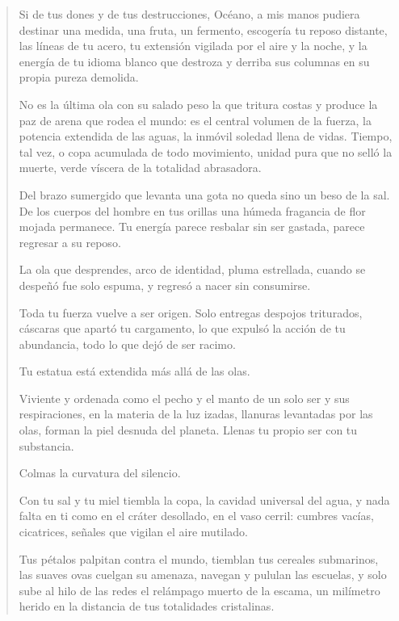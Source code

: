 \documentclass[12pt]{article}
\begin{document}
\clearpage
{}
\begin{verse}
Si de tus dones y de tus destrucciones, Océano, a mis manos  
pudiera destinar una medida, una fruta, un fermento,  
escogería tu reposo distante, las líneas de tu acero,  
tu extensión vigilada por el aire y la noche,  
y la energía de tu idioma blanco  
que destroza y derriba sus columnas  
en su propia pureza demolida.  
	
 No es la última ola con su salado peso  
 la que tritura costas y produce  
 la paz de arena que rodea el mundo:  
 es el central volumen de la fuerza,  
 la potencia extendida de las aguas,  
 la inmóvil soledad llena de vidas.  
 Tiempo, tal vez, o copa acumulada  
 de todo movimiento, unidad pura  
 que no selló la muerte, verde víscera  
 de la totalidad abrasadora.  
	 
 Del brazo sumergido que levanta una gota  
 no queda sino un beso de la sal. De los cuerpos  
 del hombre en tus orillas una húmeda fragancia  
 de flor mojada permanece. Tu energía  
 parece resbalar sin ser gastada,  
 parece regresar a su reposo.  
	 
 La ola que desprendes,  
 arco de identidad, pluma estrellada,  
 cuando se despeñó fue solo espuma,  
 y regresó a nacer sin consumirse.  
	 
 Toda tu fuerza vuelve a ser origen.  
 Solo entregas despojos triturados,  
 cáscaras que apartó tu cargamento,  
 lo que expulsó la acción de tu abundancia,  
 todo lo que dejó de ser racimo.  
	 
 Tu estatua está extendida más allá de las olas.  
	
Viviente y ordenada como el pecho y el manto  
de un solo ser y sus respiraciones,  
en la materia de la luz izadas,  
llanuras levantadas por las olas,  
forman la piel desnuda del planeta.  
Llenas tu propio ser con tu substancia.  
	
Colmas la curvatura del silencio.  
	
Con tu sal y tu miel tiembla la copa,  
la cavidad universal del agua,  
y nada falta en ti como en el cráter  
desollado, en el vaso cerril:  
cumbres vacías, cicatrices, señales  
que vigilan el aire mutilado.  
	
 Tus pétalos palpitan contra el mundo,  
 tiemblan tus cereales submarinos,  
 las suaves ovas cuelgan su amenaza,  
 navegan y pululan las escuelas,  
 y solo sube al hilo de las redes  
 el relámpago muerto de la escama,  
 un milímetro herido en la distancia  
 de tus totalidades cristalinas.  

\end{verse}
\end{document}
